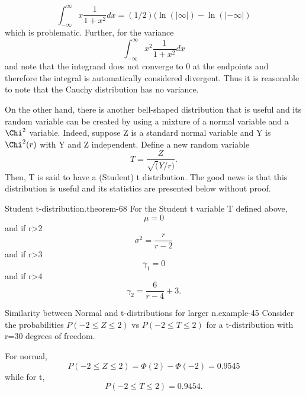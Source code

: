 \documentclass[10pt,]{book}
\numberwithin{equation}{section}
\begin{document}
\begin{equation*}
\int_{-\infty}^{\infty} x \frac{1}{1+x^2} dx = (1/2) ( \ln( | \infty |) - \ln( | -\infty |)
\end{equation*}
which is problematic.  Further, for the variance%
\begin{equation*}
\int_{-\infty}^{\infty} x^2 \frac{1}{1+x^2} dx 
\end{equation*}
and note that the integrand does not converge to 0 at the endpoints and therefore the integral is automatically considered divergent.  Thus it is reasonable to note that the Cauchy distribution has no variance.%
\par
\hypertarget{p-1259}{}%
On the other hand, there is another bell-shaped distribution that is useful and its random variable can be created by using a mixture of a normal variable and a \(\Chi^2\) variable. Indeed, suppose Z is a standard normal variable and Y is \(\Chi^2(r)\) with Y and Z independent.  Define a new random variable%
\begin{equation*}
T = \frac{Z}{\sqrt(Y/r)}.
\end{equation*}
Then, T is said to have a (Student) t distribution.  The good news is that this distribution is useful and its statistics are presented below without proof. \begin{theorem}{Student t-distribution.}{}{theorem-68}%
\hypertarget{p-1260}{}%
For the Student t variable T defined above,%
\begin{equation*}
\mu = 0
\end{equation*}
and if r>2%
\begin{equation*}
\sigma^2 = \frac{r}{r-2}
\end{equation*}
and if r>3%
\begin{equation*}
\gamma_1 = 0
\end{equation*}
and if r>4%
\begin{equation*}
\gamma_2 = \frac{6}{r-4} + 3.
\end{equation*}
%
\end{theorem}
%
\par
\hypertarget{p-1261}{}%
\begin{example}{Similarity between Normal and t-distributions for larger n.}{example-45}%
\hypertarget{p-1262}{}%
Consider the probabilities \(P(-2 \le Z \le 2)\) vs \(P(-2 \le T \le 2)\) for a t-distribution with r=30 degrees of freedom.%
\par
\hypertarget{p-1263}{}%
For normal,%
\begin{equation*}
P(-2 \le Z \le 2) = \Phi(2) - \Phi(-2) = 0.9545
\end{equation*}
while for t,%
\begin{equation*}
P(-2 \le T \le 2) = 0.9454.
\end{equation*}
%
\end{example}
\end{document}
